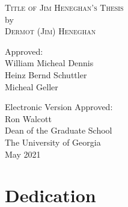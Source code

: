 \documentclass[12pt]{report}
\newcommand{\majorprof}{William Micheal Dennis} %
\newcommand{\proftwo}{Heinz Bernd Schuttler} %
\newcommand{\profthree}{Micheal Geller} %
\newcommand{\thesisyear}{2021} %
\newcommand{\yourname}{Dermot (Jim) Heneghan} %
\newcommand{\thesistitle}{Title of Jim Heneghan's Thesis} %
\newcommand{\graddean}{Ron Walcott} %
\begin{document}
\newpage
\thispagestyle{empty}
\vspace*{18pt}
\begin{center}
\textsc{\thesistitle}\\[18pt]
by\\[18pt]
\textsc{\yourname}
\end{center}
\vspace*{50pt}
\begin{center}\singlespacing
\hskip 48pt {Approved:}\\
\vskip 12pt
\hspace*{155pt}\majorprof\\
\vskip 12pt
\hspace*{155pt}\proftwo\\
\hspace*{155pt}\makebox[100pt][l]{~                }\profthree        \\
\end{center}
\vfill
\begin{flushleft}\singlespacing
Electronic Version Approved:\\[12pt]
\graddean\\
Dean of the Graduate School\\
The University of Georgia\\
May \thesisyear
\end{flushleft}


\chapter*{Dedication}




\tableofcontents %
\end{document}
